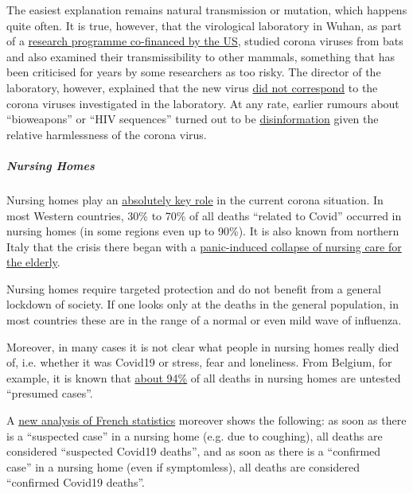 \begin{itemize}
  The easiest explanation remains natural transmission or mutation,
  which happens quite often. It is true, however, that the virological
  laboratory in Wuhan, as part of a
  \href{https://www.newsweek.com/dr-fauci-backed-controversial-wuhan-lab-millions-us-dollars-risky-coronavirus-research-1500741}{research
  programme co-financed by the US}, studied corona viruses from bats and
  also examined their transmissibility to other mammals, something that
  has been criticised for years by some researchers as too risky. The
  director of the laboratory, however, explained that the new virus
  \href{https://www.scientificamerican.com/article/how-chinas-bat-woman-hunted-down-viruses-from-sars-to-the-new-coronavirus1/}{did
  not correspond} to the corona viruses investigated in the laboratory.
  At any rate, earlier rumours about ``bioweapons'' or ``HIV sequences''
  turned out to be
  \href{https://onlinelibrary.wiley.com/doi/full/10.1111/eci.13222}{disinformation}
  given the relative harmlessness of the corona virus.
\end{itemize}

\hypertarget{nursing-homes}{%
\subparagraph{\texorpdfstring{\textbf{Nursing
Homes}}{Nursing Homes}}\label{nursing-homes}}

Nursing homes play an
\href{https://ltccovid.org/2020/04/12/mortality-associated-with-covid-19-outbreaks-in-care-homes-early-international-evidence/}{absolutely
key role} in the current corona situation. In most Western countries,
30\% to 70\% of all deaths ``related to Covid'' occurred in nursing
homes (in some regions even up to 90\%). It is also known from northern
Italy that the crisis there began with a
\href{https://swprs.org/covid-19-a-report-from-italy/}{panic-induced
collapse of nursing care for the elderly}.

Nursing homes require targeted protection and do not benefit from a
general lockdown of society. If one looks only at the deaths in the
general population, in most countries these are in the range of a normal
or even mild wave of influenza.

Moreover, in many cases it is not clear what people in nursing homes
really died of, i.e. whether it was Covid19 or stress, fear and
loneliness. From Belgium, for example, it is known that
\href{https://web.archive.org/web/20200424212535/https://covid-19.sciensano.be/sites/default/files/Covid19/Meest\%20recente\%20update.pdf}{about
94\%} of all deaths in nursing homes are untested ``presumed cases''.

A
\href{https://covidinfos.net/covid19/deces-dus-au-covid-19-le-nombre-officiel-de-morts-en-france-est-il-surestime/502/}{new
analysis of French statistics} moreover shows the following: as soon as
there is a ``suspected case'' in a nursing home (e.g. due to coughing),
all deaths are considered ``suspected Covid19 deaths'', and as soon as
there is a ``confirmed case'' in a nursing home (even if symptomless),
all deaths are considered ``confirmed Covid19 deaths''.

